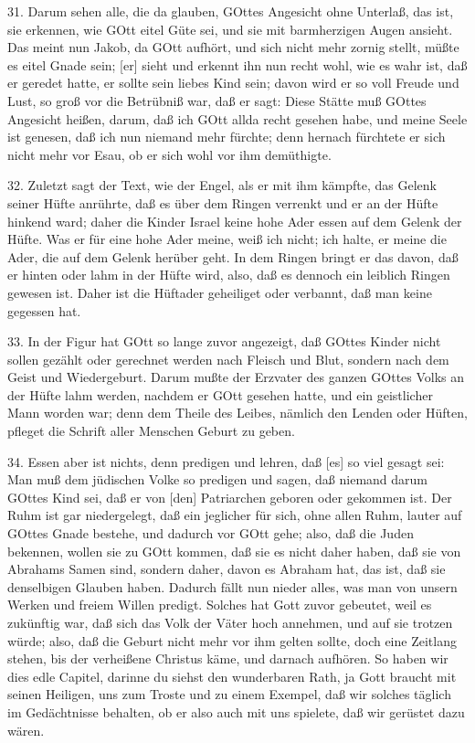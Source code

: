 31. Darum sehen alle, die da glauben, GOttes Angesicht ohne Unterlaß, das ist, sie erkennen, wie GOtt eitel Güte sei, und sie mit barmherzigen Augen ansieht. Das meint nun Jakob, da GOtt aufhört, und sich nicht mehr zornig stellt, müßte es eitel Gnade sein; [er] sieht und erkennt ihn nun recht wohl, wie es wahr ist, daß er geredet hatte, er sollte sein liebes Kind sein; davon wird er so voll Freude und Lust, so groß vor die Betrübniß war, daß er sagt: Diese Stätte muß GOttes Angesicht heißen, darum, daß ich GOtt allda recht gesehen habe, und meine Seele ist genesen, daß ich nun niemand mehr fürchte; denn hernach fürchtete er sich nicht mehr vor Esau, ob er sich wohl vor ihm demüthigte.

32. Zuletzt sagt der Text, wie der Engel, als er mit ihm kämpfte, das Gelenk seiner Hüfte anrührte, daß es über dem Ringen verrenkt und er an der Hüfte hinkend ward; daher die Kinder Israel keine hohe Ader essen auf dem Gelenk der Hüfte. Was er für eine hohe Ader meine, weiß ich nicht; ich halte, er meine die Ader, die auf dem Gelenk herüber geht. In dem Ringen bringt er das davon, daß er hinten oder lahm in der Hüfte wird, also, daß es dennoch ein leiblich
Ringen gewesen ist. Daher ist die Hüftader geheiliget oder verbannt, daß man keine gegessen hat.

33. In der Figur hat GOtt so lange zuvor angezeigt, daß GOttes Kinder nicht sollen gezählt oder gerechnet werden nach Fleisch und Blut, sondern nach dem Geist und Wiedergeburt. Darum mußte der Erzvater des ganzen GOttes Volks an der Hüfte lahm werden, nachdem er GOtt gesehen hatte, und ein geistlicher Mann worden war; denn dem Theile des Leibes, nämlich den Lenden oder Hüften, pfleget die Schrift aller Menschen Geburt zu geben.

34. Essen aber ist nichts, denn predigen und lehren, daß [es] so viel gesagt sei: Man muß dem jüdischen Volke so predigen und sagen, daß niemand darum GOttes Kind sei, daß er von [den] Patriarchen geboren oder gekommen ist. Der Ruhm ist gar niedergelegt, daß ein jeglicher für sich, ohne allen Ruhm, lauter auf GOttes Gnade bestehe, und dadurch vor GOtt gehe; also, daß die Juden bekennen, wollen sie zu GOtt kommen, daß sie es nicht daher haben, daß sie von Abrahams Samen sind, sondern daher, davon es Abraham hat, das ist, daß sie denselbigen Glauben haben. Dadurch fällt nun nieder alles, was man von unsern Werken und freiem Willen predigt. Solches hat Gott zuvor gebeutet, weil es zukünftig war, daß sich das Volk der Väter hoch annehmen, und auf sie trotzen würde; also, daß die Geburt nicht mehr vor ihm gelten sollte, doch eine Zeitlang stehen, bis der verheißene Christus käme, und darnach aufhören. So haben wir dies edle Capitel, darinne du siehst den wunderbaren Rath, ja Gott braucht mit seinen Heiligen, uns zum Troste und zu einem Exempel, daß wir solches täglich im Gedächtnisse behalten, ob er also auch mit uns spielete, daß wir gerüstet dazu wären.

